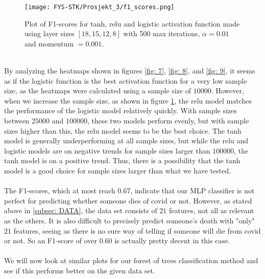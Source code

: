 \documentclass[english,notitlepage,reprint,nofootinbib]{revtex4-1}  %
\begin{document}
\begin{figure}[H]
    \centering
    \texttt{[image: FYS-STK/Prosjekt\_3/f1\_scores.png]}
    \caption{Plot of F1-scores for tanh, relu and logistic activation function made using layer sizes $[18,15,12,8]$ with 500 max iterations, $\alpha = 0.01$ and momentum $= 0.001$.}
    \label{fig: 10}
\end{figure}
\\
By analyzing the heatmaps shown in figures \ref{fig: 7}, \ref{fig: 8}, and \ref{fig: 9}, it seems as if the logistic function is the best activation function for a very low sample size, as the heatmaps were calculated using a sample size of $10 000$. However, when we increase the sample size, as shown in figure \ref{fig: 10}, the relu model matches the performance of the logistic model relatively quickly. With sample sizes between $25 000$ and $100 000$, these two models perform evenly, but with sample sizes higher than this, the relu model seems to be the best choice. The tanh model is generally underperforming at all sample sizes, but while the relu and logistic models are on negative trends for sample sizes larger than $100 000$, the tanh model is on a positive trend. Thus, there is a possibility that the tanh model is a good choice for sample sizes larger than what we have tested. 
\\
\\
 The F1-scores, which at most reach 0.67, indicate that our MLP classifier is not perfect for predicting whether someone dies of covid or not. However, as stated above in \ref{subsec: DATA}, the data set consists of $21$ features, not all as relevant as the others. It is also difficult to precisely predict someone's death with "only" $21$ features, seeing as there is no sure way of telling if someone will die from covid or not. So an F1-score of over $0.60$ is actually pretty decent in this case. 
\\
\\
We will now look at similar plots for our forest of trees classification method and see if this performs better on the given data set.
\end{document}
